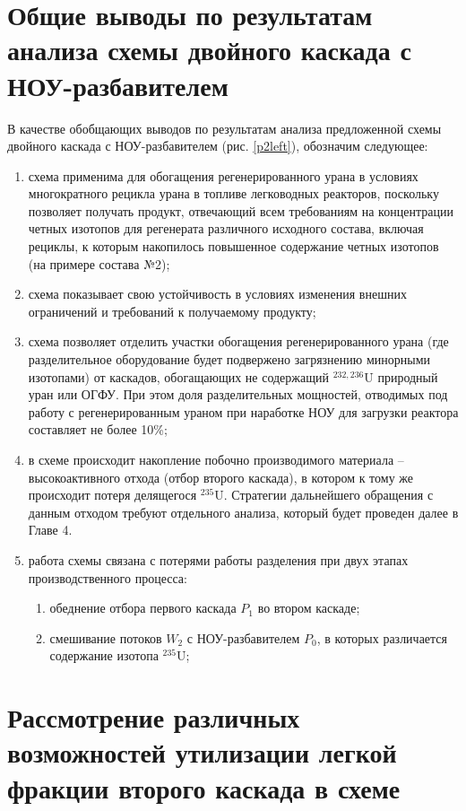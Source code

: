 \section{Общие выводы по результатам анализа схемы двойного каскада с НОУ-разбавителем}

В качестве обобщающих выводов по результатам анализа предложенной схемы двойного каскада с НОУ-разбавителем (рис. \ref{p2left}), обозначим следующее:
\begin{enumerate}
    \item схема применима для обогащения регенерированного урана в условиях многократного рецикла урана в топливе легководных реакторов, поскольку позволяет получать продукт, отвечающий всем требованиям на концентрации четных изотопов для регенерата различного исходного состава, включая рециклы, к которым накопилось повышенное содержание четных изотопов (на примере состава №2);
    \item схема показывает свою устойчивость в условиях изменения внешних ограничений и требований к получаемому продукту;
    \item схема позволяет отделить участки обогащения регенерированного урана (где разделительное оборудование будет подвержено загрязнению минорными изотопами) от каскадов, обогащающих не содержащий $^{232,236}$U природный уран или ОГФУ. При этом доля разделительных мощностей, отводимых под работу с регенерированным ураном при наработке НОУ для загрузки реактора составляет не более 10\%;
     \item в схеме происходит накопление побочно производимого материала -- высокоактивного отхода (отбор второго каскада), в котором к тому же происходит потеря делящегося $^{235}$U. Стратегии дальнейшего обращения с данным отходом требуют отдельного анализа, который будет проведен далее в Главе 4.
    \item работа схемы связана с потерями работы разделения при двух этапах производственного процесса:
    \begin{enumerate}
        \item обеднение отбора первого каскада $P_1$ во втором каскаде;
        \item смешивание потоков $W_2$ с НОУ-разбавителем $P_0$, в которых различается содержание изотопа $^{235}$U;
    \end{enumerate}
\end{enumerate}






\section{Рассмотрение различных возможностей утилизации легкой фракции второго каскада в схеме}

